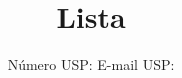 \documentclass[tikz, twoside, fleqn]{article}
\title{Lista \esnumber}
\author{\studentname \qquad Número USP: \uspid \qquad E-mail USP: \uspmail}
\begin{document}
\maketitle
\tableofcontents
\listoffigures
\lstlistoflistings

\newpage

\newpage

\newpage

\newpage


\newpage

\newpage

\newpage

\newpage

\newpage

\newpage



\end{document}
